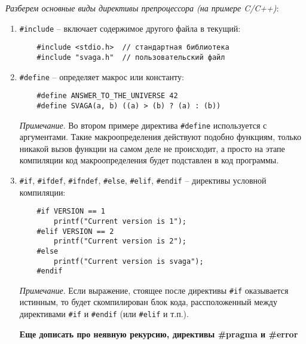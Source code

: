 \textit {Разберем основные виды директивы препроцессора (на примере C/C++)}:
\begin{enumerate}[font=\footnotesize, noitemsep, topsep=0pt, partopsep=0pt]

\vspace{5pt} \hline \vspace{5pt}
	\item \verb|#include| -- включает содержимое другого файла в текущий: \par
	\begin{verbatim}
	#include <stdio.h>  // стандартная библиотека
	#include "svaga.h"  // пользовательский файл
	\end{verbatim}

\vspace{5pt} \hline \vspace{5pt}
	\item \verb|#define| -- определяет макрос или константу: \par
	\begin{verbatim}
	#define ANSWER_TO_THE_UNIVERSE 42
	#define SVAGA(a, b) ((a) > (b) ? (a) : (b))
	\end{verbatim}
\textit{Примечание}. Во втором примере директива \verb|#define| используется с аргументами. Такие макроопределения действуют подобно функциям, только никакой вызов функции на самом деле не происходит, а просто на этапе компиляции код макроопределения будет подставлен в код программы.

\vspace{5pt} \hline \vspace{5pt}
	\item \verb|#if|, \verb|#ifdef|, \verb|#ifndef|, \verb|#else|, \verb|#elif|, \verb|#endif| -- директивы условной компиляции: \par
	\begin{verbatim}
	#if VERSION == 1
	    printf("Current version is 1");
	#elif VERSION == 2
	    printf("Current version is 2");
	#else
	    printf("Current version is svaga");
	#endif
	\end{verbatim}
\textit{Примечание}. Если выражение, стоящее после директивы \verb|#if| оказывается истинным, то будет скомпилирован блок кода, рассположенный между директивами \verb|#if| и \verb|#endif| (или \verb|#elif| и т.п.).

\textbf{\LARGE Еще дописать про неявную рекурсию, директивы #pragma и #error}

\end{enumerate}

